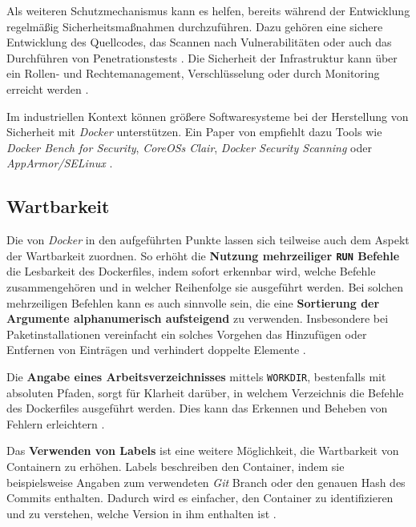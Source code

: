 Als weiteren Schutzmechanismus kann es helfen, bereits während der Entwicklung regelmäßig Sicherheitsmaßnahmen durchzuführen. Dazu gehören eine sichere Entwicklung des Quellcodes, das Scannen nach Vulnerabilitäten oder auch das Durchführen von Penetrationstests \cite{023:Setting-up-CI-CD-Pipeline-in-the-Cloud-for-Web-Application}. Die Sicherheit der Infrastruktur kann über ein Rollen- und Rechtemanagement, Verschlüsselung oder durch Monitoring erreicht werden \cite{023:Setting-up-CI-CD-Pipeline-in-the-Cloud-for-Web-Application,024:Investiugating-Impact-of-Containerization-on-Deployment-Process-in-DevOps}.

Im industriellen Kontext können größere Softwaresysteme bei der Herstellung von Sicherheit mit \textit{Docker} unterstützen. Ein Paper von \citeauthor{022:Automated-Cloud-Infrastructure-Continous-Integration-and-Continous-Delivery-using-Docker} empfiehlt dazu Tools wie \textit{Docker Bench for Security}, \textit{CoreOSs Clair}, \textit{Docker Security Scanning} oder \textit{AppArmor/SELinux} \cite{022:Automated-Cloud-Infrastructure-Continous-Integration-and-Continous-Delivery-using-Docker}.

\subsection{Wartbarkeit}
\label{subsec:05-03-03_maintainability}

Die von \textit{Docker} in den  aufgeführten Punkte lassen sich teilweise auch dem Aspekt der Wartbarkeit zuordnen. So erhöht die \textbf{Nutzung mehrzeiliger \texttt{RUN} Befehle} die Lesbarkeit des Dockerfiles, indem sofort erkennbar wird, welche Befehle zusammengehören und in welcher Reihenfolge sie ausgeführt werden. Bei solchen mehrzeiligen Befehlen kann es auch sinnvolle sein, die eine \textbf{Sortierung der Argumente alphanumerisch aufsteigend} zu verwenden. Insbesondere bei Paketinstallationen vereinfacht ein solches Vorgehen das Hinzufügen oder Entfernen von Einträgen und verhindert doppelte Elemente \cite{300:Building-Best-Practices}.

Die \textbf{Angabe eines Arbeitsverzeichnisses} mittels \texttt{WORKDIR}, bestenfalls mit absoluten Pfaden, sorgt für Klarheit darüber, in welchem Verzeichnis die Befehle des Dockerfiles ausgeführt werden. Dies kann das Erkennen und Beheben von Fehlern erleichtern \cite{300:Building-Best-Practices}.

Das \textbf{Verwenden von Labels} ist eine weitere Möglichkeit, die Wartbarkeit von Containern zu erhöhen. Labels beschreiben den Container, indem sie beispielsweise Angaben zum verwendeten \textit{Git} Branch oder den genauen Hash des Commits enthalten. Dadurch wird es einfacher, den Container zu identifizieren und zu verstehen, welche Version in ihm enthalten ist \cite{013:Role-of-Containers-in-Reproducibility,300:Building-Best-Practices}.


